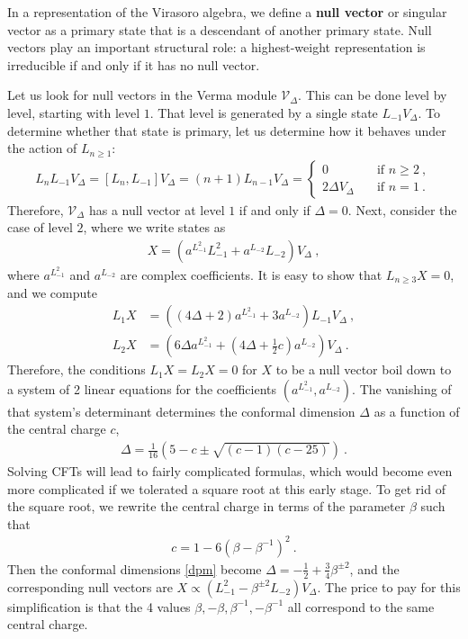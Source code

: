 \documentclass[12pt, a4paper]{article}
\newcommand{\myindex}[1]{\textbf{\boldmath #1}}
\begin{document}
In a representation of the Virasoro algebra, we define a \myindex{null vector} or singular vector as a primary state that is a descendant of another primary state. Null vectors play an important structural role: a highest-weight representation is irreducible if and only if it has no null vector. 

Let us look for null vectors in the Verma module $\mathcal{V}_\Delta$. This can be done level by level, starting with level $1$. That level is generated by a single state $L_{-1}V_\Delta$. To determine whether that state is primary, let us determine how it behaves under the action of $L_{n\geq 1}$:
\begin{align}
L_n L_{-1}V_\Delta = [L_n, L_{-1}] V_\Delta = (n+1) L_{n-1}V_\Delta = 
\left\{\begin{array}{ll} 0 &  \quad \text{if } n\geq 2\ , \\ 2\Delta V_\Delta & \quad \text{if } n = 1\ . \end{array}\right. 
\end{align}
Therefore, $\mathcal{V}_\Delta$ has a null vector at level $1$ if and only if $\Delta=0$. Next, consider the case of level $2$, where we write states as 
\begin{align}
 X{} = \left(a^{L_{-1}^2} L_{-1}^2 + a^{L_{-2}} L_{-2}\right) V_\Delta\ ,
\end{align}
where $a^{L_{-1}^2}$ and $a^{L_{-2}}$ are complex coefficients. It is easy to show that $L_{n\geq 3}X{}=0$, and we compute 
\begin{subequations}
\label{l1x}
\begin{align}
 L_1X{} &= \left((4\Delta+2)a^{L_{-1}^2} + 3a^{L_{-2}}\right) L_{-1}V_\Delta\ ,
\\
L_2 X{} &= \left(6\Delta a^{L_{-1}^2}+(4\Delta+\tfrac12 c) a^{L_{-2}}\right)V_\Delta\ .
\end{align}
\end{subequations}
Therefore, the conditions $L_1X{}=L_2 X{}=0$ for $X{}$ to be a null vector boil down to a system of 2 linear equations for the coefficients $(a^{L_{-1}^2},a^{L_{-2}})$. The vanishing of that system's determinant determines the conformal dimension $\Delta$ as a function of the central charge $c$,
\begin{align}
 \Delta = \frac{1}{16}\left( 5-c\pm\sqrt{(c-1)(c-25)} \right) \ .
 \label{dpm}
\end{align}
Solving CFTs will lead to fairly complicated formulas, which would become even more complicated if we tolerated a square root at this early stage.
To get rid of the square root, we rewrite the central charge in terms of the parameter $\beta$ such that 
\begin{align}
 \boxed{c = 1- 6\left(\beta - \beta^{-1}\right)^2 } \ .
 \label{cb}
\end{align}
Then the conformal dimensions \eqref{dpm} become 
$
 \Delta = -\frac12 + \frac34\beta^{\pm 2}
$, and the corresponding null vectors are $X\propto \left(L_{-1}^2 -\beta^{\pm 2}L_{-2}\right)V_\Delta$.
The price to pay for this simplification is that the 4 values $\beta,-\beta,\beta^{-1},-\beta^{-1}$ all correspond to the same central charge. 
\end{document}
